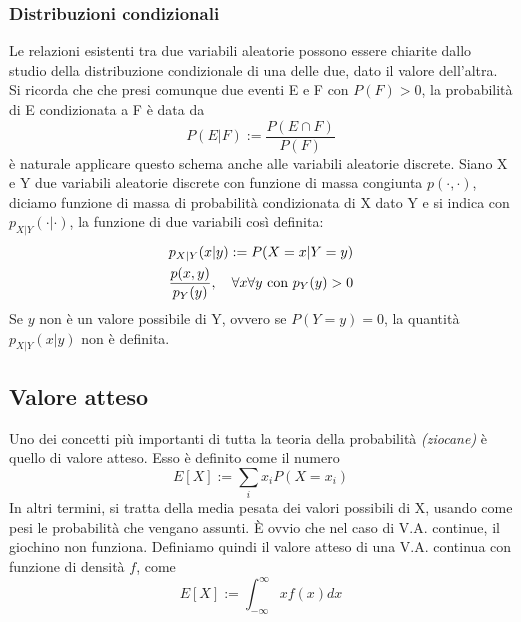 \documentclass[11pt]{article}
\begin{document}
\subsubsection{Distribuzioni condizionali}
Le relazioni esistenti tra due variabili aleatorie possono essere chiarite dallo studio della distribuzione condizionale di una delle due, dato il valore dell'altra. Si ricorda che che presi comunque due eventi E e F con $P(F)>0$, la probabilità di E condizionata a F è data da
\begin{displaymath}
    P(E|F):=\frac{P(E\cap F)}{P(F)}
\end{displaymath}
è naturale applicare questo schema anche alle variabili aleatorie discrete.
Siano X e Y due variabili aleatorie discrete con funzione di massa congiunta $p(\cdot , \cdot)$, diciamo funzione di massa di probabilità condizionata di X dato Y e si indica con $p_{X|Y}(\cdot | \cdot)$, la funzione di due variabili così definita:
\begin{gather*}
    p_{X|Y}(x|y) := P(X=x|Y=y)\\ 
    \frac{p(x,y)}{p_Y(y)},\hspace{10px}\forall x \forall y \mbox{ con }p_Y(y)>0
\end{gather*}
Se $y$ non è un valore possibile di Y, ovvero se $P(Y=y)=0$, la quantità $p_{X|Y}(x|y)$ non è definita. 
\subsection{Valore atteso}
Uno dei concetti più importanti di tutta la teoria della probabilità \textit{(ziocane)} è quello di valore atteso. Esso è definito come il numero
\begin{displaymath}
    E[X]:=\sum_i x_i P(X=x_i)
\end{displaymath}
In altri termini, si tratta della media pesata dei valori possibili di X, usando come pesi le probabilità che vengano assunti. È ovvio che nel caso di V.A. continue, il giochino non funziona. Definiamo quindi il valore atteso di una V.A. continua con funzione di densità $f$, come
\begin{displaymath}
    E[X]:=\int_{-\infty}^\infty xf(x)dx
\end{displaymath}
\end{document}
